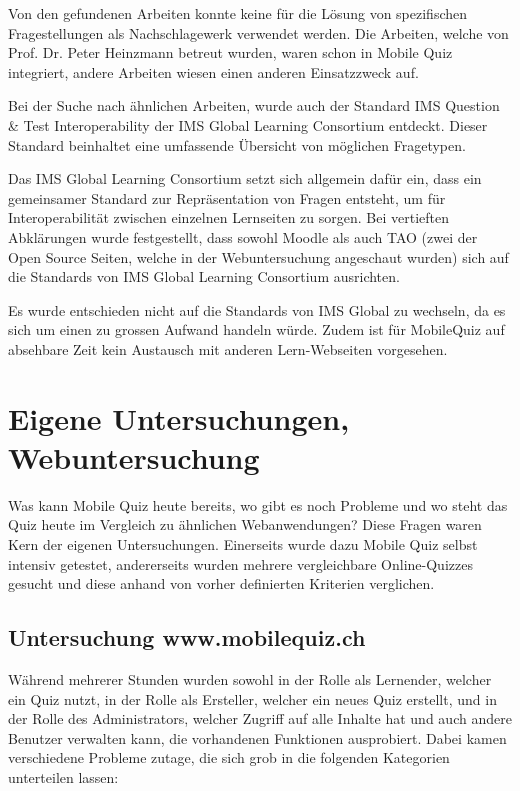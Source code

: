 Von den gefundenen Arbeiten konnte keine für die Lösung von spezifischen Fragestellungen als Nachschlagewerk verwendet werden. Die Arbeiten, welche von Prof. Dr. Peter Heinzmann betreut wurden, waren schon in Mobile Quiz integriert, andere Arbeiten wiesen einen anderen Einsatzzweck auf.

Bei der Suche nach ähnlichen Arbeiten, wurde auch der Standard \glqq IMS Question \& Test Interoperability\grqq \cite{imsglobal.org} der IMS Global Learning Consortium entdeckt. Dieser Standard beinhaltet eine umfassende Übersicht von möglichen Fragetypen.

Das IMS Global Learning Consortium setzt sich allgemein dafür ein, dass ein gemeinsamer Standard zur Repräsentation von Fragen entsteht, um für Interoperabilität zwischen einzelnen Lernseiten zu sorgen. Bei vertieften Abklärungen wurde festgestellt, dass sowohl Moodle \cite{moodle} als auch TAO \cite{tao} (zwei der Open Source Seiten, welche in der Webuntersuchung angeschaut wurden) sich auf die Standards von IMS Global Learning Consortium ausrichten.

Es wurde entschieden nicht auf die Standards von IMS Global zu wechseln, da es sich um einen zu grossen Aufwand handeln würde. Zudem ist für MobileQuiz auf absehbare Zeit kein Austausch mit anderen Lern-Webseiten vorgesehen.


\section{Eigene Untersuchungen, Webuntersuchung}
\label{sec:eigeneUntersuchungenWebuntersuchungen}

Was kann Mobile Quiz heute bereits, wo gibt es noch Probleme und wo steht das Quiz heute im Vergleich zu ähnlichen Webanwendungen? Diese Fragen waren Kern der eigenen Untersuchungen. Einerseits wurde dazu Mobile Quiz selbst intensiv getestet, andererseits wurden mehrere vergleichbare Online-Quizzes gesucht und diese anhand von vorher definierten Kriterien verglichen.


	\subsection{Untersuchung www.mobilequiz.ch}
	\label{subsec:eigeneUntersuchungen}
	Während mehrerer Stunden wurden sowohl in der Rolle als Lernender, welcher ein Quiz nutzt, in der Rolle als Ersteller, welcher ein neues Quiz erstellt, und in der Rolle des Administrators, welcher Zugriff auf alle Inhalte hat und auch andere Benutzer verwalten kann, die vorhandenen Funktionen ausprobiert. Dabei kamen verschiedene Probleme zutage, die sich grob in die folgenden Kategorien unterteilen lassen:
	
